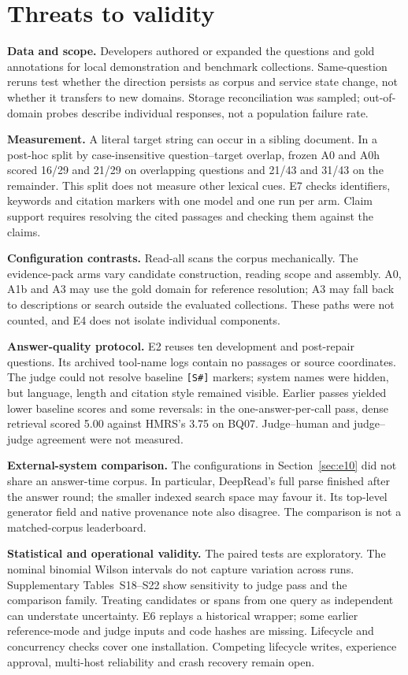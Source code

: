 \section{Threats to validity}
\label{sec:threats}

\noindent\textbf{Data and scope.} Developers authored or expanded the
questions and gold annotations for local demonstration and benchmark
collections. Same-question reruns test whether the direction persists as
corpus and service state change, not whether it transfers to new domains.
Storage reconciliation was sampled; out-of-domain probes describe individual
responses, not a population failure rate.

\noindent\textbf{Measurement.} A literal target string can occur in a sibling
document. In a post-hoc split by case-insensitive question--target overlap,
frozen A0 and A0h scored 16/29 and 21/29 on overlapping questions and
21/43 and 31/43 on the remainder. This split does not measure other lexical
cues. E7 checks identifiers, keywords and citation markers with one model
and one run per arm. Claim support requires resolving the cited passages and
checking them against the claims.

\noindent\textbf{Configuration contrasts.} Read-all scans the corpus
mechanically. The evidence-pack arms vary candidate construction, reading
scope and assembly. A0, A1b and A3 may use the gold domain for reference
resolution; A3 may fall back to descriptions or search outside the evaluated
collections. These paths were not counted, and E4 does not isolate
individual components.

\noindent\textbf{Answer-quality protocol.} E2 reuses ten development and
post-repair questions. Its archived tool-name logs contain no passages or
source coordinates. The judge could not resolve baseline \texttt{[S\#]}
markers; system names were hidden, but language, length and citation style
remained visible. Earlier passes yielded lower baseline scores and some
reversals: in the one-answer-per-call pass, dense retrieval scored 5.00
against HMRS's 3.75 on BQ07. Judge--human and judge--judge agreement were
not measured.

\noindent\textbf{External-system comparison.} The configurations in
Section~\ref{sec:e10} did not share an answer-time corpus. In particular,
DeepRead's full parse finished after the answer round; the smaller indexed
search space may favour it. Its top-level generator field and native
provenance note also disagree. The comparison is not a matched-corpus
leaderboard.

\noindent\textbf{Statistical and operational validity.} The paired tests are
exploratory. The nominal binomial Wilson intervals do not capture variation
across runs. Supplementary Tables~S18--S22 show sensitivity to judge pass
and the comparison family. Treating candidates or spans from one query as
independent can understate uncertainty. E6 replays a historical wrapper;
some earlier reference-mode and judge inputs and code hashes are missing.
Lifecycle and concurrency checks cover one installation. Competing lifecycle
writes, experience approval, multi-host reliability and crash recovery
remain open.